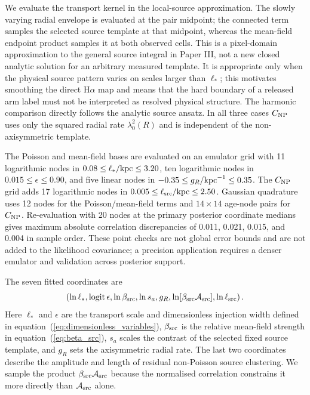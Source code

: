 \documentclass[fleqn,usenatbib]{mnras}
\begin{document}
We evaluate the transport kernel in the local-source approximation.  The slowly varying radial envelope is evaluated at the pair midpoint; the connected term samples the selected source template at that midpoint, whereas the mean-field endpoint product samples it at both observed cells.  This is a pixel-domain approximation to the general source integral in Paper III, not a new closed analytic solution for an arbitrary measured template.  It is appropriate only when the physical source pattern varies on scales larger than $\ell_\ast$; this motivates smoothing the direct H$\alpha$ map and means that the hard boundary of a released arm label must not be interpreted as resolved physical structure.  The harmonic comparison directly follows the analytic source ansatz.  In all three cases $C_{\rm NP}$ uses only the squared radial rate $\lambda_0^2(R)$ and is independent of the non-axisymmetric template.

The Poisson and mean-field bases are evaluated on an emulator grid with 11 logarithmic nodes in $0.08\leq\ell_\ast/{\rm kpc}\leq3.20$, ten logarithmic nodes in $0.015\leq\epsilon\leq0.90$, and five linear nodes in $-0.35\leq g_R/{\rm kpc}^{-1}\leq0.35$.  The $C_{\rm NP}$ grid adds 17 logarithmic nodes in $0.005\leq\ell_{\rm src}/{\rm kpc}\leq2.50$.  Gaussian quadrature uses 12 nodes for the Poisson/mean-field terms and $14\times14$ age-node pairs for $C_{\rm NP}$.  Re-evaluation with 20 nodes at the primary posterior coordinate medians gives maximum absolute correlation discrepancies of 0.011, 0.021, 0.015, and 0.004 in sample order.  These point checks are not global error bounds and are not added to the likelihood covariance; a precision application requires a denser emulator and validation across posterior support.

The seven fitted coordinates are
\begin{equation}
    \left(
    \ln\ell_\ast,
    \operatorname{logit}\epsilon,
    \ln\beta_{\rm src},
    \ln s_a,
    g_R,
    \ln[\beta_{\rm src}{\cal A}_{\rm src}],
    \ln\ell_{\rm src}
    \right).
    \label{eq:phangs_fit_coordinates}
\end{equation}
Here $\ell_\ast$ and $\epsilon$ are the transport scale and dimensionless injection width defined in equation~(\ref{eq:dimensionless_variables}), $\beta_{\rm src}$ is the relative mean-field strength in equation~(\ref{eq:beta_src}), $s_a$ scales the contrast of the selected fixed source template, and $g_R$ sets the axisymmetric radial rate.  The last two coordinates describe the amplitude and length of residual non-Poisson source clustering.  We sample the product $\beta_{\rm src}{\cal A}_{\rm src}$ because the normalised correlation constrains it more directly than ${\cal A}_{\rm src}$ alone.
\end{document}
